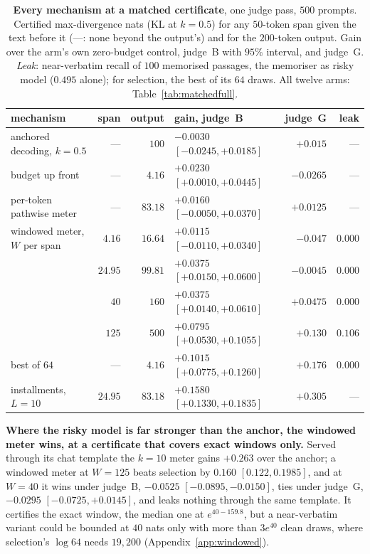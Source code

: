 \begin{table}[t]
\centering\footnotesize
\caption{\textbf{Every mechanism at a matched certificate}, one judge pass, $500$ prompts. Certified
max-divergence nats (KL at $k=0.5$) for any $50$-token span given the text before it (---: none
beyond the output's) and for the $200$-token output. Gain over the arm's own zero-budget
control, judge~B with $95\%$ interval, and judge~G. \emph{Leak}: near-verbatim recall of $100$ memorised
passages, the memoriser as risky model ($0.495$ alone); for selection, the best of its $64$ draws. All
twelve arms: Table~\ref{tab:matchedfull}.}
\label{tab:matched}
\setlength{\tabcolsep}{4pt}
\begin{tabular}{@{}lrrlrr@{}}
\toprule
mechanism & span & output & gain, judge~B & judge~G & leak \\
\midrule
anchored decoding, $k=0.5$ & --- & $100$ & $-0.0030$ $[-0.0245, +0.0185]$ & $+0.015$ & --- \\
budget up front & --- & $4.16$ & $+0.0230$ $[+0.0010, +0.0445]$ & $-0.0265$ & --- \\
per-token pathwise meter & --- & $83.18$ & $+0.0160$ $[-0.0050, +0.0370]$ & $+0.0125$ & --- \\
windowed meter, $W$ per span & $4.16$ & $16.64$ & $+0.0115$ $[-0.0110, +0.0340]$ & $-0.047$ & $0.000$ \\
 & $24.95$ & $99.81$ & $+0.0375$ $[+0.0150, +0.0600]$ & $-0.0045$ & $0.000$ \\
 & $40$ & $160$ & $+0.0375$ $[+0.0140, +0.0610]$ & $+0.0475$ & $0.000$ \\
 & $125$ & $500$ & $+0.0795$ $[+0.0530, +0.1055]$ & $+0.130$ & $0.106$ \\
\midrule
best of $64$ & --- & $4.16$ & $+0.1015$ $[+0.0775, +0.1260]$ & $+0.176$ & $0.000$ \\
installments, $L=10$ & $24.95$ & $83.18$ & $+0.1580$ $[+0.1330, +0.1835]$ & $+0.305$ & --- \\
\bottomrule
\end{tabular}
\end{table}

\textbf{Where the risky model is far stronger than the anchor, the windowed meter wins, at a
certificate that covers exact windows only.} Served through its chat template the $k=10$ meter gains $+0.263$ over the anchor; a windowed meter at
$W = 125$ beats selection by $0.160$ $[0.122, 0.1985]$, and at $W=40$ it wins under judge~B, $-0.0525$
$[-0.0895, -0.0150]$, ties under judge~G, $-0.0295$ $[-0.0725, +0.0145]$, and leaks nothing through the same
template. It certifies the exact window, the median one at $e^{40-159.8}$, but a near-verbatim variant could
be bounded at $40$ nats only with more than $3e^{40}$ clean draws, where selection's $\log 64$ needs
$19{,}200$ (Appendix~\ref{app:windowed}).


